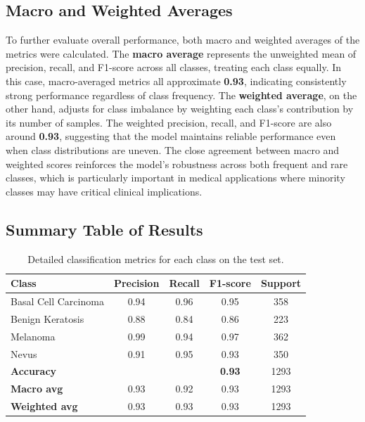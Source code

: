 \documentclass[a4paper,12pt]{report}
\begin{document}
\begin{spacing}{1.5}
    \subsection{Macro and Weighted Averages}
    To further evaluate overall performance, both macro and weighted averages of the metrics were calculated. The \textbf{macro average} represents the unweighted mean of precision, recall, and F1-score across all classes, treating each class equally. In this case, macro-averaged metrics all approximate \textbf{0.93}, indicating consistently strong performance regardless of class frequency. The \textbf{weighted average}, on the other hand, adjusts for class imbalance by weighting each class’s contribution by its number of samples. The weighted precision, recall, and F1-score are also around \textbf{0.93}, suggesting that the model maintains reliable performance even when class distributions are uneven. The close agreement between macro and weighted scores reinforces the model’s robustness across both frequent and rare classes, which is particularly important in medical applications where minority classes may have critical clinical implications.
    
    
    \subsection{Summary Table of Results}
    \begin{table}[H]
    \caption{Detailed classification metrics for each class on the test set.}
    \centering
    \renewcommand{\arraystretch}{1.2}
    \begin{tabular}{lcccc}
    \hline
    \textbf{Class} & \textbf{Precision} & \textbf{Recall} & \textbf{F1-score} & \textbf{Support} \\
    \hline
    Basal Cell Carcinoma & 0.94 & 0.96 & 0.95 & 358 \\
    Benign Keratosis     & 0.88 & 0.84 & 0.86 & 223 \\
    Melanoma             & 0.99 & 0.94 & 0.97 & 362 \\
    Nevus                & 0.91 & 0.95 & 0.93 & 350 \\
    \hline
    \textbf{Accuracy}    &      &      & \textbf{0.93} & 1293 \\
    \textbf{Macro avg}   & 0.93 & 0.92 & 0.93 & 1293 \\
    \textbf{Weighted avg}& 0.93 & 0.93 & 0.93 & 1293 \\
    \hline
    \end{tabular}
    \end{table}
    

\end{spacing}
\end{document}
